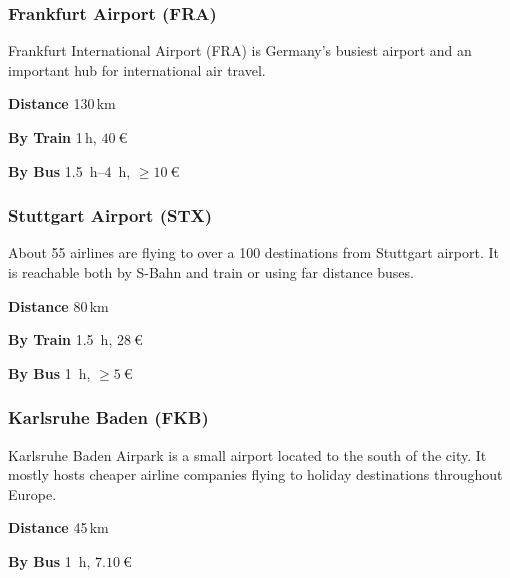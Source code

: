 \begin{multicols}{2}
\raggedcolumns

\subsubsection{Frankfurt Airport (FRA)}

Frankfurt International Airport (FRA) is Germany's busiest airport and an important hub for
international air travel.
\begin{labeling}{\hspace*{10ex}}
  \item[\bf Distance] 130\,km
  \item[\bf By Train] 1\,h, $\SI{40}{\euro}$
  \item[\bf By Bus] \SI{1.5}{h}–\SI{4}{h}, $\ge\SI{10}{\euro}$
\end{labeling}

\subsubsection{Stuttgart Airport (STX)}

About 55 airlines are flying to over a 100 destinations from Stuttgart airport.
It is reachable both by S-Bahn and train or using far distance buses.

\begin{labeling}{\hspace*{10ex}}
  \item[\bf Distance] 80\,km
  \item[\bf By Train] \SI{1.5}{\hour}, $\SI{28}{\euro}$
  \item[\bf By Bus] \SI{1}{\hour}, $\ge\SI{5}{\euro}$
\end{labeling}

\subsubsection{Karlsruhe Baden (FKB)}

Karlsruhe Baden Airpark is a small airport located to the south of the city. It
mostly hosts cheaper airline companies flying to holiday destinations
throughout Europe.

\begin{labeling}{\hspace*{10ex}}
  \item[\bf Distance] 45\,km
  \item[\bf By Bus] \SI{1}{\hour}, $\SI{7.10}{\euro}$
\end{labeling}


\end{multicols}
